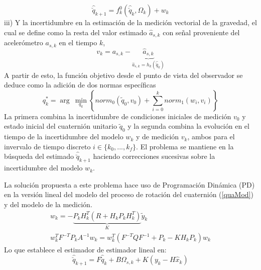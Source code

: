 \documentclass[conference]{IEEEtran}
\begin{document}
\begin{equation}
\label{quaMod}
\hat{\breve{q}}_{k+1}=f^0_k(\hat{\breve{q}}_k,\Omega_k)+w_k
\end{equation}
 iii) Y la incertidumbre en la estimación de la medición vectorial de la gravedad, el cual se define como la resta del valor estimado $\hat{a}_{s,k}$ con señal proveniente del acelerómetro $a_{s,k}$ en el tiempo $k$,
\begin{equation}
v_k=a_{s,k}-\underbrace{\hat{a}_{s,k}}_{\hat{a}_{s,k}=h_k(\hat{\breve{q}}_k)}
\end{equation}
A partir de esto, la función objetivo desde el punto de vista del observador se deduce como la adición de dos normas específicas
\begin{equation}
q^*_k=\arg~\min_{q_k}\left\{norm_0(\tilde{q}_0,v_0)+\sum^k_{i=0}norm_1(w_i,v_i)\right\}
\end{equation}
La primera combina la incertidumbre de condiciones iniciales de medición $v_0$ y estado inicial del cuaternión unitario $\tilde{q}_0$ y la segunda combina la evolución en el tiempo de la incertidumbre del modelo $w_k$ y de medición $v_k$, ambos para el invervalo de  tiempo discreto $i\in\{k_0,...,k_f\}$. El problema se mantiene en la búsqueda del estimado $\hat{\breve{q}}_{k+1}$ haciendo correcciones sucesivas sobre la incertidumbre del modelo $w_k$.\par
La solución propuesta a este problema hace uso de Programación Dinámica (PD) \cite{Lewis2012} en la versión lineal del modelo del proceso de rotación del cuaternión (\ref{quaMod}) y del modelo de la medición.
\begin{gather}
w_{k}=-\underbrace{P_kH_k^T(R+H_kP_kH_k^T)}_K\tilde{y}_k\\
w_k^TF^{-T}P_kA^{-1}w_k=w_k^T(F^{-T}QF^{-1}+P_k-KH_kP_k)w_k
\end{gather}
Lo que establece el estimador de estimador lineal en:
\begin{equation}\label{chap2:ObservadorLineal}
\hat{\breve{q}}_{k+1}=F\hat{\breve{q}}_k+B\Omega_{s,k}+K(y_k-H\hat{x}_k)
\end{equation}
\end{document}

